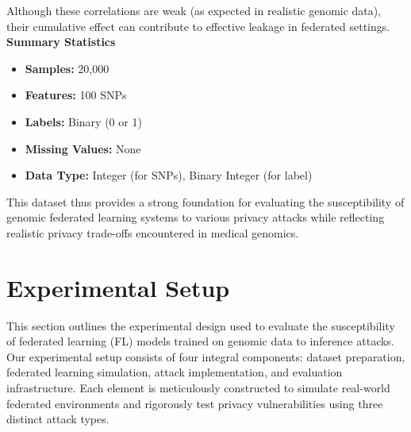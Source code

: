 \documentclass[conference]{IEEEtran}
\begin{document}
Although these correlations are weak (as expected in realistic genomic data), their cumulative effect can contribute to effective leakage in federated settings.
\newline
\newline
\textbf{Summary Statistics}
\begin{itemize}
    \item \textbf{Samples:} 20,000
    \item \textbf{Features:} 100 SNPs
    \item \textbf{Labels:} Binary (0 or 1)
    \item \textbf{Missing Values:}  None
    \item \textbf{Data Type:} Integer (for SNPs), Binary Integer (for label)
\end{itemize}

This dataset thus provides a strong foundation for evaluating the susceptibility of genomic federated learning systems to various privacy attacks while reflecting realistic privacy trade-offs encountered in medical genomics.

\section{Experimental Setup}

This section outlines the experimental design used to evaluate the susceptibility of federated learning (FL) models trained on genomic data to inference attacks. Our experimental setup consists of four integral components: dataset preparation, federated learning simulation, attack implementation, and evaluation infrastructure. Each element is meticulously constructed to simulate real-world federated environments and rigorously test privacy vulnerabilities using three distinct attack types.
\end{document}
